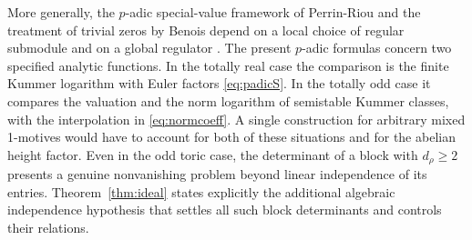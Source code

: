 \documentclass[11pt]{amsart}
\numberwithin{equation}{section}
\theoremstyle{definition}
\theoremstyle{remark}
\begin{document}
More generally, the $p$-adic special-value framework of
Perrin-Riou and the treatment of trivial zeros by Benois
depend on a local choice of regular submodule and on a
global regulator \cite{PerrinRiou,Benois}. The present
$p$-adic formulas concern two specified analytic functions.
In the totally real case the comparison is the finite
Kummer logarithm with Euler factors \eqref{eq:padicS}.
In the totally odd case it compares the valuation and
the norm logarithm of semistable Kummer classes, with
the interpolation in \eqref{eq:normcoeff}. A single
construction for arbitrary mixed 1-motives would have to
account for both of these situations and for the abelian
height factor. Even in the odd toric case, the determinant
of a block with $d_\rho\ge2$ presents a genuine
nonvanishing problem beyond linear independence of its
entries. Theorem~\ref{thm:ideal} states explicitly the
additional algebraic independence hypothesis that settles
all such block determinants and controls their relations.
\end{document}
